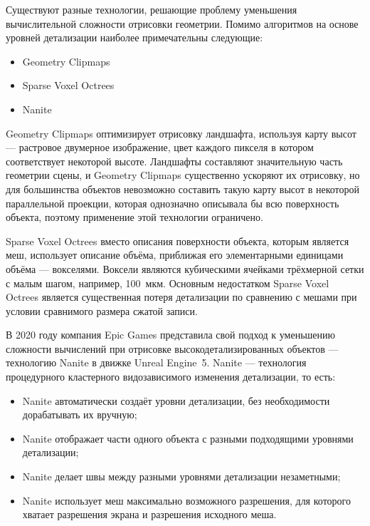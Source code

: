 Существуют разные технологии, решающие проблему уменьшения вычислительной сложности отрисовки геометрии.
Помимо алгоритмов на основе уровней детализации наиболее примечательны следующие:
\begin{itemize}
    \item Geometry Clipmaps \cite{GPUGems2GeometryClipmaps}
    \item Sparse Voxel Octrees \cite{SparseVoxelOctrees}
    \item Nanite \cite{NaniteManual}
\end{itemize}

Geometry Clipmaps оптимизирует отрисовку ландшафта, используя карту высот --- растровое двумерное изображение, цвет каждого пикселя в котором соответствует некоторой высоте.
Ландшафты составляют значительную часть геометрии сцены, и Geometry Clipmaps существенно ускоряют их отрисовку, но для большинства объектов невозможно составить такую карту высот в некоторой параллельной проекции, которая однозначно описывала бы всю поверхность объекта, поэтому применение этой технологии ограничено.

Sparse Voxel Octrees вместо описания поверхности объекта, которым является меш, использует описание объёма, приближая его элементарными единицами объёма --- вокселями.
Воксели являются кубическими ячейками трёхмерной сетки с малым шагом, например, 100~мкм.
Основным недостатком Sparse Voxel Octrees является существенная потеря детализации по сравнению с мешами при условии сравнимого размера сжатой записи.

В 2020 году компания Epic Games представила свой подход к уменьшению сложности вычислений при отрисовке высокодетализированных объектов --- технологию Nanite в движке Unreal Engine~5.
Nanite --- технология процедурного кластерного видозависимого изменения детализации, то есть:
\begin{itemize}
    \item Nanite автоматически создаёт уровни детализации, без необходимости дорабатывать их вручную;
    \item Nanite отображает части одного объекта с разными подходящими уровнями детализации;
    \item Nanite делает швы между разными уровнями детализации незаметными;
    \item Nanite использует меш максимально возможного разрешения, для которого хватает разрешения экрана и разрешения исходного меша.
\end{itemize}

